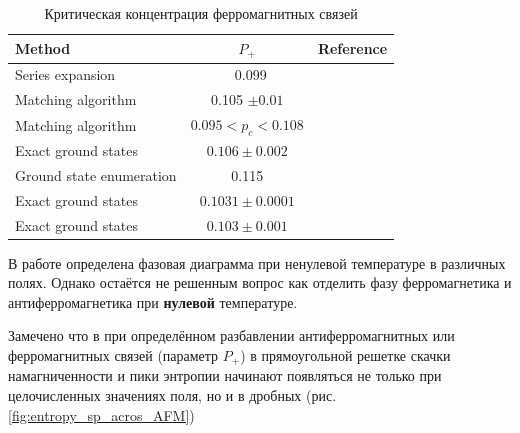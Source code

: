 \documentclass[utf8, babel, sor, jor, amsmath, amssymb, reprint]{elsarticle} %
\begin{document}
\begin{table}[!h]
	\begin{tabular}{|l|c|l|}
		\hline
		Method                                   & $P_{+}$                                       & Reference                                           
		\\ \hline
		Series expansion 								& ~0.099                                  & \cite{PhysRevB.19.260}    \\ \hline
	     Matching algorithm                            & 
	     0.105 $\pm 0.01$                                        & \cite{H_Freund_1989} \\ \hline
		Matching algorithm                      & 
		$0.095<p_c<0.108$                                          & \cite{BENDISCH1994139}      \\ \hline
		Exact ground states                       & 
		$0.106 \pm 0.002$                               & \cite{N.Kawashima_1997}     \\ \hline
		Ground state enumeration                             & 0.115                                          & \cite{PhysRevE.58.1502} \\ \hline
    	Exact ground states        & 
		$0.1031\pm0.0001$                                          & \cite{WANG200331}   \\ \hline
		Exact ground states   & $0.103\pm0.001$                                       & \cite{amoruso2004domain} 
		    \\ \hline
			
	\end{tabular}
	\label{tab:lit_phase}
	\caption{Критическая концентрация ферромагнитных связей}
\end{table}

В работе \cite{trukhin4855337thermodynamic} определена фазовая диаграмма при ненулевой температуре в различных полях. Однако остаётся не решенным вопрос как отделить фазу ферромагнетика и антиферромагнетика при \textbf{нулевой} температуре.

Замечено что в при определённом разбавлении антиферромагнитных или ферромагнитных связей (параметр $P_+$) в прямоугольной решетке скачки намагниченности и пики энтропии начинают появляться не только при целочисленных значениях поля, но и в дробных (рис. \ref{fig:entropy_sp_acros_AFM})
\end{document}
